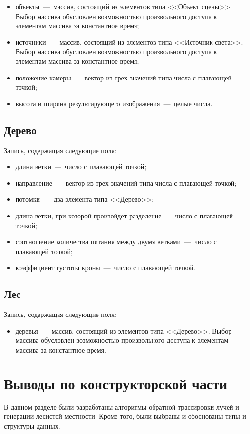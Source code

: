 \begin{itemize}
	\item объекты~---~массив, состоящий из элементов типа <<Объект сцены>>. Выбор массива обусловлен возможностью произвольного доступа к элементам массива за константное время;
	\item источники~---~массив, состоящий из элементов типа <<Источник света>>. Выбор массива обусловлен возможностью произвольного доступа к элементам массива за константное время;
	\item положение камеры~---~вектор из трех значений типа числа с плавающей точкой;
	\item высота и ширина результирующего изображения~---~целые числа.
	
\end{itemize}

\subsection{Дерево}
Запись, содержащая следующие поля:

\begin{itemize}
	\item длина ветки~---~число с плавающей точкой;
	\item направление~---~вектор из трех значений типа числа с плавающей точкой;
	\item потомки~---~два элемента типа <<Дерево>>;
	\item длина ветки, при которой произойдет разделение~---~число с плавающей точкой;
	\item соотношение количества питания между двумя ветками~---~число с плавающей точкой;
	\item коэффициент густоты кроны~---~число с плавающей точкой.
\end{itemize}

\subsection{Лес}
Запись, содержащая следующие поля:

\begin{itemize}
	\item деревья~---~массив, состоящий из элементов типа <<Дерево>>. Выбор массива обусловлен возможностью произвольного доступа к элементам массива за константное время.
\end{itemize}

\section{Выводы по конструкторской части}
В данном разделе были разработаны алгоритмы обратной трассировки лучей и генерации лесистой местности. Кроме того, были выбраны и обоснованы типы и структуры данных.

\newpage